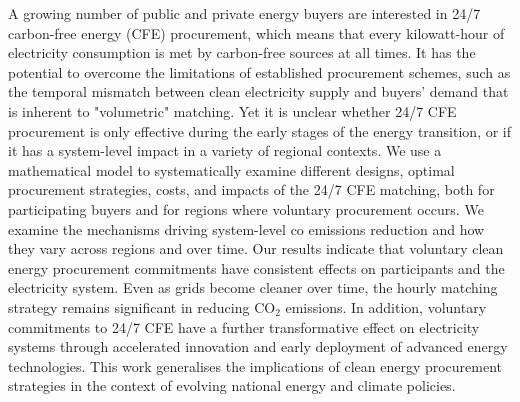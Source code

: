 A growing number of public and private energy buyers are interested in 24/7 carbon-free energy (CFE) procurement, which means that every kilowatt-hour of electricity consumption is met by carbon-free sources at all times.
It has the potential to overcome the limitations of established procurement schemes, such as the temporal mismatch between clean electricity supply and buyers' demand that is inherent to "volumetric" matching. 
Yet it is unclear whether 24/7 CFE procurement is only effective during the early stages of the energy transition, or if it has a system-level impact in a variety of regional contexts.
We use a mathematical model to systematically examine different designs, optimal procurement strategies, costs, and impacts of the 24/7 CFE matching, both for participating buyers and for regions where voluntary procurement occurs.
We examine the mechanisms driving system-level co emissions reduction and how they vary across regions and over time.
Our results indicate that voluntary clean energy procurement commitments have consistent effects on participants and the electricity system.
Even as grids become cleaner over time, the hourly matching strategy remains significant in reducing CO$_2$ emissions.
In addition, voluntary commitments to 24/7 CFE have a further transformative effect on electricity systems through accelerated innovation and early deployment of advanced energy technologies.
This work generalises the implications of clean energy procurement strategies in the context of evolving national energy and climate policies.




